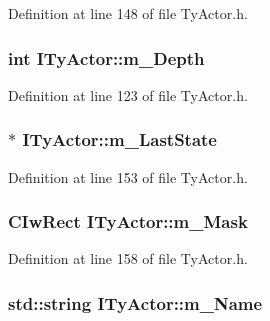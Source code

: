 Definition at line 148 of file TyActor.h.

\hypertarget{class_i_ty_actor_ac075325d62fdcda89c2a91f2c1298376}{
\subsubsection[{m\_\-Depth}]{\setlength{\rightskip}{0pt plus 5cm}int {\bf ITyActor::m\_\-Depth}}}
\label{class_i_ty_actor_ac075325d62fdcda89c2a91f2c1298376}


Definition at line 123 of file TyActor.h.

\hypertarget{class_i_ty_actor_a12954e3e8f5596a65c239cf3d126f7a1}{
\subsubsection[{m\_\-LastState}]{$\ast$ {\bf ITyActor::m\_\-LastState}}}
\label{class_i_ty_actor_a12954e3e8f5596a65c239cf3d126f7a1}


Definition at line 153 of file TyActor.h.

\hypertarget{class_i_ty_actor_abd0ddacb8e677d2d36ead794883dee4c}{
\subsubsection[{m\_\-Mask}]{\setlength{\rightskip}{0pt plus 5cm}CIwRect {\bf ITyActor::m\_\-Mask}}}
\label{class_i_ty_actor_abd0ddacb8e677d2d36ead794883dee4c}


Definition at line 158 of file TyActor.h.

\hypertarget{class_i_ty_actor_afdfb0e1ed5a47085f52f95f276010bb6}{
\subsubsection[{m\_\-Name}]{\setlength{\rightskip}{0pt plus 5cm}std::string {\bf ITyActor::m\_\-Name}}}
\label{class_i_ty_actor_afdfb0e1ed5a47085f52f95f276010bb6}


